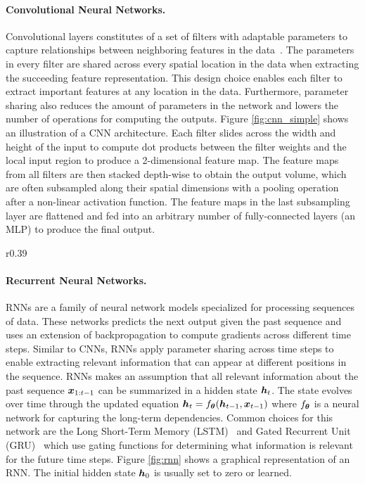 \paragraph{Convolutional Neural Networks.} Convolutional layers constitutes of a set of filters with adaptable parameters to capture relationships between neighboring features in the data~\cite{lecun1998gradient}. The parameters in every filter are shared across every spatial location in the data when extracting the succeeding feature representation. This design choice enables each filter to extract important features at any location in the data. Furthermore, parameter sharing also reduces the amount of parameters in the network and lowers the number of operations for computing the outputs. Figure \ref{fig:cnn_simple} shows an illustration of a CNN architecture. Each filter slides across the width and height of the input to compute dot products between the filter weights and the local input region to produce a 2-dimensional feature map. The feature maps from all filters are then stacked depth-wise to obtain the output volume, which are often subsampled along their spatial dimensions with a pooling operation after a non-linear activation function. The feature maps in the last subsampling layer are flattened and fed into an arbitrary number of fully-connected layers (an MLP) to produce the final output. 


\vspace{-3mm}
\begin{wrapfigure}{r}{0.39\textwidth}
	\centering
	\vspace{-3mm}
	\resizebox{0.39\textwidth}{!}{
		
	}
	\captionsetup{width=.9\linewidth}
	\caption{Graphical representation of RNN.}
	\vspace{-3mm}
	\label{fig:rnn}
\end{wrapfigure}
\paragraph{Recurrent Neural Networks.} RNNs are a family of neural network models specialized for processing sequences of data. These networks predicts the next output given the past sequence and uses an extension of backpropagation to compute gradients across different time steps. 
Similar to CNNs, RNNs apply parameter sharing across time steps to enable extracting relevant information that can appear at different positions in the sequence. RNNs makes an assumption that all relevant information about the past sequence ${\bm{x}}_{1:t-1}$ can be summarized in a hidden state ${\bm{h}}_t$. The state evolves over time through the updated equation ${\bm{h}}_t = f_{{\bm{\theta}}}({\bm{h}}_{t-1}, {\bm{x}}_{t-1})$ where $f_{{\bm{\theta}}}$ is a neural network for capturing the long-term dependencies. Common choices for this network are the Long Short-Term Memory (LSTM)~\cite{hochreiter1997long} and Gated Recurrent Unit (GRU)~\cite{chung2014empirical} which use gating functions for determining what information is relevant for the future time steps. Figure \ref{fig:rnn} shows a graphical representation of an RNN. The initial hidden state ${\bm{h}}_0$ is usually set to zero or learned. 


